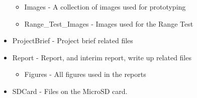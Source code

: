 \begin{itemize}
\begin{itemize}
\item Images - A collection of images used for prototyping
\item Range\_Test\_Images - Images used for the Range Test
\end{itemize}
\item ProjectBrief - Project brief related files
\item Report - Report, and interim report, write up related files
\begin{itemize}
\item Figures - All figures used in the reports
\end{itemize}
\item SDCard - Files on the MicroSD card. 
\end{itemize} 
        

